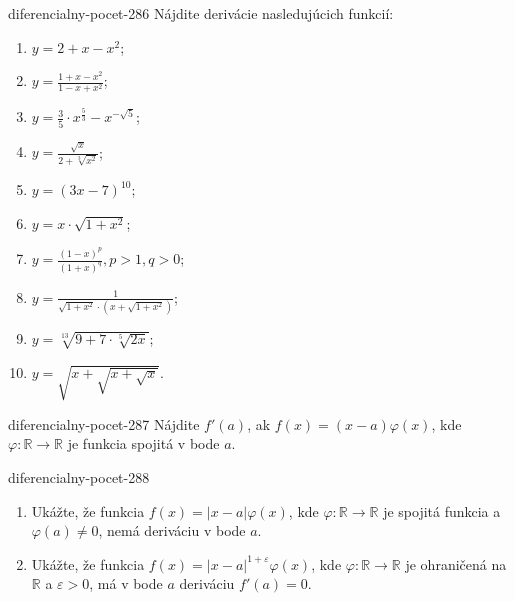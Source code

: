 \begin{defproblem}{diferencialny-pocet-286}
Nájdite derivácie nasledujúcich funkcií:
\begin{multicols}{2}
\begin{enumerate}
    \item $y=2+x-x^2$;
    \item $y=\frac{1+x-x^2}{1-x+x^2}$;
    \item $y=\frac{3}{5}\cdot x^{\frac{5}{3}}-x^{-\sqrt{5}}$;
    \item $y=\frac{\sqrt{x}}{2+\sqrt[3]{x^2}}$;
    \item $y=(3x-7)^{10}$;
    \item $y=x\cdot \sqrt{1+x^2}$;
    \item $y=\frac{(1-x)^p}{(1+x)^q},p>1,q>0$;
    \item $y=\frac{1}{\sqrt{1+x^2}\cdot (x+\sqrt{1+x^2})}$;
    \item $y=\sqrt[13]{9+7\cdot \sqrt[5]{2x}}$;
    \item $y=\sqrt{x+\sqrt{x+\sqrt{x}}}$.
\end{enumerate}
\end{multicols}
\end{defproblem}

\begin{defproblem}{diferencialny-pocet-287}
Nájdite $f'(a)$, ak $f(x)=(x-a)\varphi(x)$, kde $\varphi:\mathbb{R}\rightarrow\mathbb{R}$ je funkcia spojitá v bode $a$.
\end{defproblem}

\begin{defproblem}{diferencialny-pocet-288}
\begin{enumerate}
\item Ukážte, že funkcia $f(x)=|x-a|\varphi(x)$, kde $\varphi:\mathbb{R}\rightarrow\mathbb{R}$ je spojitá funkcia a $\varphi(a) \neq 0$, nemá deriváciu v bode $a$.
\item Ukážte, že funkcia $f(x)=|x-a|^{1+\varepsilon}\varphi(x)$, kde $\varphi:\mathbb{R}\rightarrow\mathbb{R}$  je ohraničená na $\mathbb{R}$ a $\varepsilon>0$, má v bode $a$ deriváciu $f'(a)=0$.
\end{enumerate}
\end{defproblem}

